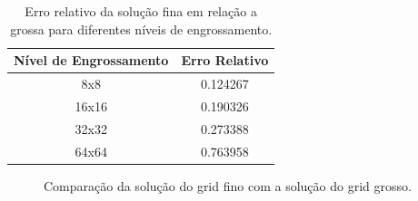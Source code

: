 \begin{table}[]
\centering

\caption{Erro relativo da solução fina em relação a grossa para diferentes níveis de engrossamento.}
\label{table:erroRelativoEngrossamento}

\begin{tabular}{|c|c|}
\hline
\textbf{Nível de Engrossamento} & \textbf{Erro Relativo} \\ \hline
8x8                             & 0.124267               \\ \hline
16x16                           & 0.190326               \\ \hline
32x32                           & 0.273388               \\ \hline
64x64                           & 0.763958               \\ \hline
\end{tabular}
\end{table}


\begin{figure}[h]
\center
{}
\qquad
{}
\caption{Comparação da solução do grid fino com a solução do grid grosso.  }
\label{fig:comparacaoFinoGrosso}
\end{figure}

